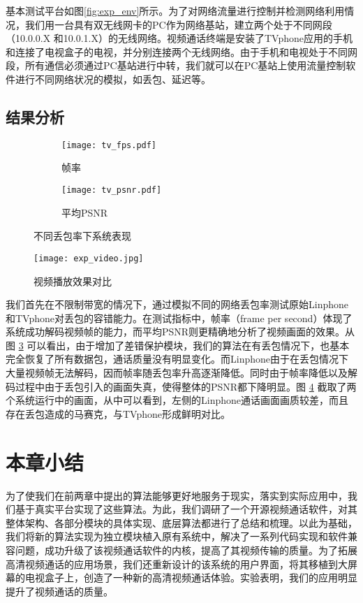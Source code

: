 基本测试平台如图\ref{fig:exp_env}所示。为了对网络流量进行控制并检测网络利用情况，我们用一台具有双无线网卡的PC作为网络基站，建立两个处于不同网段（10.0.0.X 和10.0.1.X）的无线网络。视频通话终端是安装了TVphone应用的手机和连接了电视盒子的电视，并分别连接两个无线网络。由于手机和电视处于不同网段，所有通信必须通过PC基站进行中转，我们就可以在PC基站上使用流量控制软件进行不同网络状况的模拟，如丢包、延迟等。


\subsection{结果分析}

\begin{figure}[htbp]
  \begin{subfigure}[b]{0.5\textwidth}
    \centering
    \texttt{[image: tv\_fps.pdf]}
    \caption{帧率}
    \label{pic:tv_fps}
  \end{subfigure}
  \begin{subfigure}[b]{0.5\textwidth}
    \centering
    \texttt{[image: tv\_psnr.pdf]}
    \caption{平均PSNR}
    \label{pic:tv_psnr}
  \end{subfigure}
  \caption{不同丢包率下系统表现}
  \label{fig:tv_loss}
\end{figure}

\begin{figure}[htbp]
  \centering
  \texttt{[image: exp\_video.jpg]}
  \caption{视频播放效果对比}
  \label{fig:exp_video}
\end{figure}

我们首先在不限制带宽的情况下，通过模拟不同的网络丢包率测试原始Linphone和TVphone对丢包的容错能力。在测试指标中，帧率（frame per second）体现了系统成功解码视频帧的能力，而平均PSNR则更精确地分析了视频画面的效果。从图 \ref{fig:tv_loss} 可以看出，由于增加了差错保护模块，我们的算法在有丢包情况下，也基本完全恢复了所有数据包，通话质量没有明显变化。而Linphone由于在丢包情况下大量视频帧无法解码，因而帧率随丢包率升高逐渐降低。同时由于帧率降低以及解码过程中由于丢包引入的画面失真，使得整体的PSNR都下降明显。图 \ref{fig:exp_video} 截取了两个系统运行中的画面，从中可以看到，左侧的Linphone通话画面画质较差，而且存在丢包造成的马赛克，与TVphone形成鲜明对比。

\section{本章小结}
为了使我们在前两章中提出的算法能够更好地服务于现实，落实到实际应用中，我们基于真实平台实现了这些算法。为此，我们调研了一个开源视频通话软件，对其整体架构、各部分模块的具体实现、底层算法都进行了总结和梳理。以此为基础，我们将新的算法实现为独立模块植入原有系统中，解决了一系列代码实现和软件兼容问题，成功升级了该视频通话软件的内核，提高了其视频传输的质量。为了拓展高清视频通话的应用场景，我们还重新设计的该系统的用户界面，将其移植到大屏幕的电视盒子上，创造了一种新的高清视频通话体验。实验表明，我们的应用明显提升了视频通话的质量。
